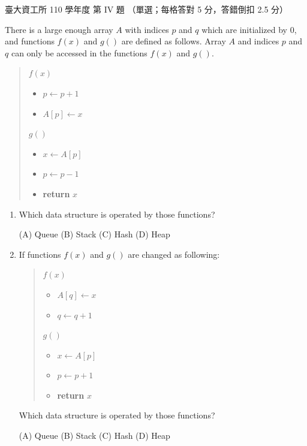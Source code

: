\begin{pastexam}[label={px:ntu-110-dsaa-04}]{臺大資工所 110 學年度 第 IV 題}
（單選；每格答對 5 分，答錯倒扣 2.5 分）

There is a large enough array $A$ with indices $p$ and $q$ which are initialized by 0, and
functions $f(x)$ and $g()$ are defined as follows. Array $A$ and indices $p$ and $q$ can only be
accessed in the functions $f(x)$ and $g()$.
\begin{quote}
$f(x)$
\begin{itemize}[nosep]
\item $p\leftarrow p+1$
\item $A[p]\leftarrow x$
\end{itemize}
$g()$
\begin{itemize}[nosep]
\item $x\leftarrow A[p]$
\item $p\leftarrow p-1$
\item \textbf{return} $x$
\end{itemize}
\end{quote}
\begin{enumerate}[label=(\alph*)]
\item Which data structure is operated by those functions? \underline{}

(A) Queue \qquad (B) Stack \qquad (C) Hash \qquad (D) Heap
\item If functions $f(x)$ and $g()$ are changed as following:
\begin{quote}
$f(x)$
\begin{itemize}[nosep]
\item $A[q]\leftarrow x$
\item $q\leftarrow q+1$
\end{itemize}
$g()$
\begin{itemize}[nosep]
\item $x\leftarrow A[p]$
\item $p\leftarrow p+1$
\item \textbf{return} $x$
\end{itemize}
\end{quote}
Which data structure is operated by those functions? \underline{}

(A) Queue \qquad (B) Stack \qquad (C) Hash \qquad (D) Heap
\end{enumerate}
\end{pastexam}

